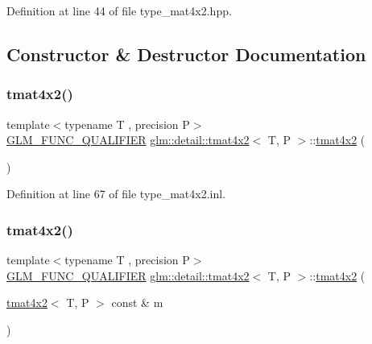 Definition at line 44 of file type\+\_\+mat4x2.\+hpp.



\subsection{Constructor \& Destructor Documentation}
\mbox{\label{structglm_1_1detail_1_1tmat4x2_a02a3962d6a1b2609f082e4b022a4c028}} 
\subsubsection{\texorpdfstring{tmat4x2()}{tmat4x2()}\hspace{0.1cm}{\footnotesize\ttfamily [1/22]}}
{\footnotesize\ttfamily template$<$typename T , precision P$>$ \\
\hyperlink{setup_8hpp_a33fdea6f91c5f834105f7415e2a64407}{G\+L\+M\+\_\+\+F\+U\+N\+C\+\_\+\+Q\+U\+A\+L\+I\+F\+I\+ER} \hyperlink{structglm_1_1detail_1_1tmat4x2}{glm\+::detail\+::tmat4x2}$<$ T, P $>$\+::\hyperlink{structglm_1_1detail_1_1tmat4x2}{tmat4x2} (\begin{DoxyParamCaption}{ }\end{DoxyParamCaption})}



Definition at line 67 of file type\+\_\+mat4x2.\+inl.

\mbox{\label{structglm_1_1detail_1_1tmat4x2_ab3c1fcf781e0219e317fde204095696a}} 
\subsubsection{\texorpdfstring{tmat4x2()}{tmat4x2()}\hspace{0.1cm}{\footnotesize\ttfamily [2/22]}}
{\footnotesize\ttfamily template$<$typename T , precision P$>$ \\
\hyperlink{setup_8hpp_a33fdea6f91c5f834105f7415e2a64407}{G\+L\+M\+\_\+\+F\+U\+N\+C\+\_\+\+Q\+U\+A\+L\+I\+F\+I\+ER} \hyperlink{structglm_1_1detail_1_1tmat4x2}{glm\+::detail\+::tmat4x2}$<$ T, P $>$\+::\hyperlink{structglm_1_1detail_1_1tmat4x2}{tmat4x2} (\begin{DoxyParamCaption}\item[{\hyperlink{structglm_1_1detail_1_1tmat4x2}{tmat4x2}$<$ T, P $>$ const \&}]{m }\end{DoxyParamCaption})}



